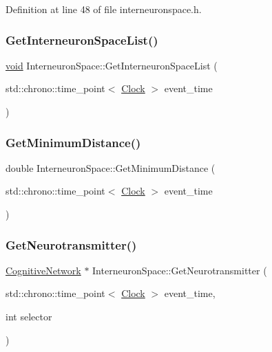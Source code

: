 Definition at line 48 of file interneuronspace.\+h.

\mbox{\label{class_interneuron_space_ae77729a0c140cfb8a9121e898be791b2}} 
\subsubsection{\texorpdfstring{Get\+Interneuron\+Space\+List()}{GetInterneuronSpaceList()}}
{\footnotesize\ttfamily \mbox{\hyperlink{glad_8h_a950fc91edb4504f62f1c577bf4727c29}{void}} Interneuron\+Space\+::\+Get\+Interneuron\+Space\+List (\begin{DoxyParamCaption}\item[{std\+::chrono\+::time\+\_\+point$<$ \mbox{\hyperlink{universe_8h_a0ef8d951d1ca5ab3cfaf7ab4c7a6fd80}{Clock}} $>$}]{event\+\_\+time }\end{DoxyParamCaption})}

\mbox{\label{class_interneuron_space_a243535a8f09f104c3a4488f6df4cfd57}} 
\subsubsection{\texorpdfstring{Get\+Minimum\+Distance()}{GetMinimumDistance()}}
{\footnotesize\ttfamily double Interneuron\+Space\+::\+Get\+Minimum\+Distance (\begin{DoxyParamCaption}\item[{std\+::chrono\+::time\+\_\+point$<$ \mbox{\hyperlink{universe_8h_a0ef8d951d1ca5ab3cfaf7ab4c7a6fd80}{Clock}} $>$}]{event\+\_\+time }\end{DoxyParamCaption})}

\mbox{\label{class_interneuron_space_a7a60c95c8706cbff3084e74b7b15d75c}} 
\subsubsection{\texorpdfstring{Get\+Neurotransmitter()}{GetNeurotransmitter()}}
{\footnotesize\ttfamily \mbox{\hyperlink{class_cognitive_network}{Cognitive\+Network}} $\ast$ Interneuron\+Space\+::\+Get\+Neurotransmitter (\begin{DoxyParamCaption}\item[{std\+::chrono\+::time\+\_\+point$<$ \mbox{\hyperlink{universe_8h_a0ef8d951d1ca5ab3cfaf7ab4c7a6fd80}{Clock}} $>$}]{event\+\_\+time,  }\item[{int}]{selector }\end{DoxyParamCaption})}



